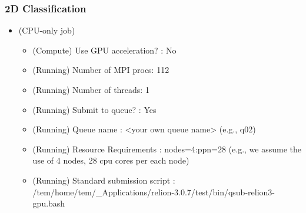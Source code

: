 \documentclass[letterpaper,10pt,english]{sphinxmanual}
\begin{document}
\subsubsection{2D Classification}
\label{\detokenize{relion:d-classification}}\begin{itemize}
\item {} 
 (CPU-only job)
\begin{itemize}
\item {} 
(Compute) Use GPU acceleration? : No

\item {} 
(Running) Number of MPI procs: 112

\item {} 
(Running) Number of threads: 1

\item {} 
(Running) Submit to queue? : Yes

\item {} 
(Running) Queue name : \textless{}your own queue name\textgreater{} (e.g., q02)

\item {} 
(Running) Resource Requirements : nodes=4:ppn=28  (e.g., we assume the use of 4 nodes, 28 cpu cores per each node)

\item {} 
(Running) Standard submission script : /tem/home/tem/\_Applications/relion-3.0.7/test/bin/qsub-relion3-gpu.bash

\end{itemize}

\end{itemize}

\end{document}
